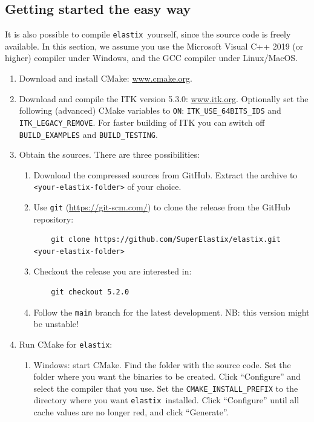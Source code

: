 \documentclass[]{report}
\newcommand{\elastix}{\texttt{elastix}}
\begin{document}
\subsection{Getting started the easy way}

It is also possible to compile \elastix\ yourself, since the source
code is freely available. In this section, we assume you use the
Microsoft Visual C++ 2019 (or higher) compiler under Windows, and
the GCC compiler under Linux/MacOS.

\begin{enumerate}
\item Download and install CMake: \url{www.cmake.org}.

\item Download and compile the ITK version 5.3.0: \url{www.itk.org}.
    Optionally set the following (advanced) CMake variables to
    \texttt{ON}: \texttt{ITK\_USE\_64BITS\_IDS}
    and \texttt{ITK\_LEGACY\_REMOVE}. For faster building of ITK
    you can switch off \texttt{BUILD\_EXAMPLES} and
    \texttt{BUILD\_TESTING}.

\item Obtain the sources. There are three possibilities:
  \begin{enumerate}
  \item Download the compressed sources from GitHub. Extract the
      archive to \texttt{<your-elastix-folder>} of your choice.
  \item Use \texttt{git} (\url{https://git-scm.com/})
      to clone the release from the GitHub repository:
    \begin{verbatim}
    git clone https://github.com/SuperElastix/elastix.git <your-elastix-folder>
    \end{verbatim}
  \item Checkout the release you are interested in:
    \begin{verbatim}
    git checkout 5.2.0
    \end{verbatim}
  \item Follow the \texttt{main} branch for the latest development.
    NB: this version might be unstable!
  \end{enumerate}

\item Run CMake for \elastix:
    \begin{enumerate}
    \item Windows: start CMake. Find the folder with the
        source code. Set the folder where you want the binaries to be
        created. Click ``Configure'' and select the compiler that you
        use. Set the \texttt{CMAKE\_INSTALL\_PREFIX} to the directory
        where you want \elastix\ installed. Click ``Configure'' until
        all cache values are no longer red, and click ``Generate''.


\end{enumerate}
\end{enumerate}
\end{document}
